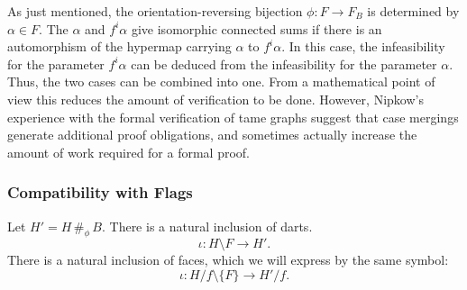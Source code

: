 \begin{remark} As just mentioned, the orientation-reversing bijection $\phi:F\to F_B$
is determined by $\alpha\in F$.  The $\alpha$ and $f^i\alpha$ give
isomorphic connected sums if there is an automorphism of the hypermap
carrying $\alpha$ to $f^i\alpha$.  In this case, the infeasibility
for the parameter $f^i\alpha$ can be deduced from the
infeasibility for the parameter $\alpha$.  Thus, the two cases can
be combined into one.  From a mathematical point of view this
reduces the amount of verification to be done.  However, Nipkow's
experience with the formal verification of tame graphs suggest
that case mergings generate additional proof obligations, and
sometimes actually increase the amount of work required for a
formal proof.
\end{remark}








\subsubsection{Compatibility with Flags}
\label{sec:com}

Let $H'= H \,\#_\phi\, B$.   There is a natural inclusion of
darts.
    $$
    \iota: H\setminus F \to H'.
    $$
There is a natural inclusion of faces, which we will express by
the same symbol:
    $$
    \iota: H/f \setminus \{F\}\to H'/f.
    $$

